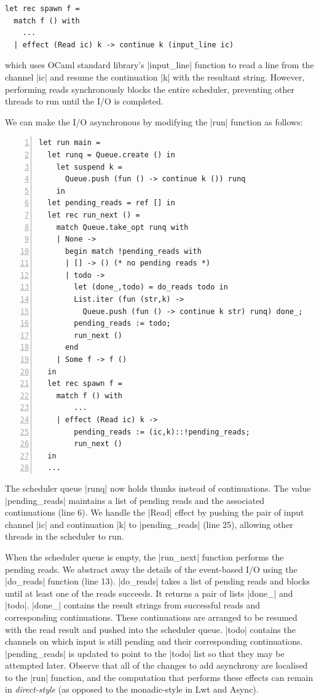 \documentclass[sigplan,screen]{acmart}
\begin{document}
\begin{lstlisting}
let rec spawn f =
  match f () with
	...
  | effect (Read ic) k -> continue k (input_line ic)
\end{lstlisting}
%
which uses OCaml standard library's |input_line| function to read a line from
the channel |ic| and resume the continuation |k| with the resultant string.
However, performing reads synchronously blocks the entire scheduler, preventing
other threads to run until the I/O is completed.

We can make the I/O asynchronous by modifying the |run| function as follows:

\begin{lstlisting}[numbers=left]
let run main =
  let runq = Queue.create () in
	let suspend k =
	  Queue.push (fun () -> continue k ()) runq
	in
  let pending_reads = ref [] in
  let rec run_next () =
    match Queue.take_opt runq with
    | None ->
      begin match !pending_reads with
      | [] -> () (* no pending reads *)
      | todo ->
        let (done_,todo) = do_reads todo in
        List.iter (fun (str,k) ->
          Queue.push (fun () -> continue k str) runq) done_;
        pending_reads := todo;
        run_next ()
      end
    | Some f -> f ()
  in
  let rec spawn f =
    match f () with
		...
    | effect (Read ic) k ->
        pending_reads := (ic,k)::!pending_reads;
        run_next ()
  in
  ...
\end{lstlisting}

The scheduler queue |runq| now holds thunks instead of continuations. The value
|pending_reads| maintains a list of pending reads and the associated
continuations (line 6). We handle the |Read| effect by pushing the pair of
input channel |ic| and continuation |k| to |pending_reads| (line 25), allowing
other threads in the scheduler to run.

When the scheduler queue is empty, the |run_next| function performs the pending
reads. We abstract away the details of the event-based I/O using the |do_reads|
function (line 13). |do_reads| takes a list of pending reads and blocks until
at least one of the reads succeeds. It returns a pair of lists |done_| and
|todo|. |done_| contains the result strings from successful reads and
corresponding continuations. These continuations are arranged to be resumed
with the read result and pushed into the scheduler queue. |todo| contains the
channels on which input is still pending and their corresponding continuations.
|pending_reads| is updated to point to the |todo| list so that they may be
attempted later. Observe that all of the changes to add asynchrony are
localised to the |run| function, and the computation that performs these
effects can remain in \emph{direct-style} (as opposed to the monadic-style in
Lwt and Async).
\end{document}
